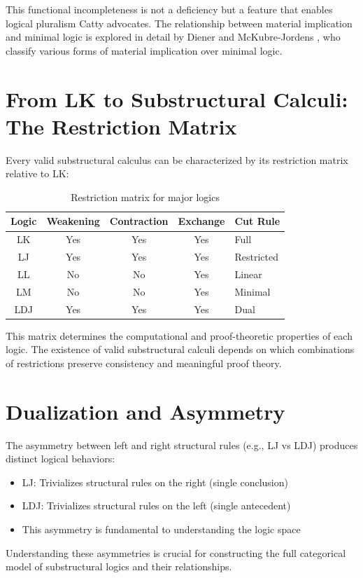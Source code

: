 This functional incompleteness is not a deficiency but a feature that enables logical pluralism Catty advocates. The relationship between material implication and minimal logic is explored in detail by Diener and McKubre-Jordens \cite{diener2016classifying}, who classify various forms of material implication over minimal logic.

\section*{From LK to Substructural Calculi: The Restriction Matrix}
Every valid substructural calculus can be characterized by its restriction matrix relative to LK:

\begin{table}[h]
\centering
\begin{tabular}{|c|c|c|c|}
\hline
Logic & Weakening & Contraction & Exchange & Cut Rule \\
\hline
LK & Yes & Yes & Yes & Full \\
LJ & Yes & Yes & Yes & Restricted \\
LL & No & No & Yes & Linear \\
LM & No & No & Yes & Minimal \\
LDJ & Yes & Yes & Yes & Dual \\
\hline
\end{tabular}
\caption{Restriction matrix for major logics}
\end{table}

This matrix determines the computational and proof-theoretic properties of each logic. The existence of valid substructural calculi depends on which combinations of restrictions preserve consistency and meaningful proof theory.

\section*{Dualization and Asymmetry}
The asymmetry between left and right structural rules (e.g., LJ vs LDJ) produces distinct logical behaviors:

\begin{itemize}
    \item LJ: Trivializes structural rules on the right (single conclusion)
    \item LDJ: Trivializes structural rules on the left (single antecedent)
    \item This asymmetry is fundamental to understanding the logic space
\end{itemize}

Understanding these asymmetries is crucial for constructing the full categorical model of substructural logics and their relationships.
